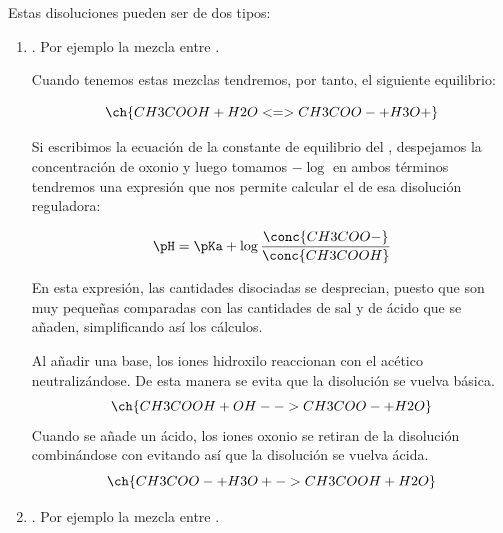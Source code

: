     Estas disoluciones pueden ser de dos tipos:
    \begin{enumerate}[label=\numberballmDarkTeal]
        \item {}.
        Por ejemplo la mezcla entre .

        Cuando tenemos estas mezclas tendremos, por tanto, el siguiente equilibrio:

        \begin{equation*}
            \ch{CH3COOH + H2O <=> CH3COO- + H3O+}
        \end{equation*}

        Si escribimos la ecuación de la constante de equilibrio del , despejamos la concentración de oxonio y luego tomamos \( -\log  \) en ambos términos tendremos una expresión que nos permite calcular el \pH{} de esa disolución reguladora:



        \begin{equation*}
            \pH = \pKa + \log\dfrac{\conc{CH3COO-}}{\conc{CH3COOH}}
        \end{equation*}

        En esta expresión, las cantidades disociadas se desprecian, puesto que son muy pequeñas comparadas con las cantidades de sal y de ácido que se añaden, simplificando así los cálculos.

        Al añadir una base, los iones hidroxilo reaccionan con el acético neutralizándose.
        De esta manera se evita que la disolución se vuelva básica.
        \begin{equation*}
            \ch{CH3COOH + OH- -> CH3COO- + H2O}
        \end{equation*}
        Cuando se añade un ácido, los iones oxonio se retiran de la disolución combinándose con  evitando así que la disolución se vuelva ácida.
        \begin{equation*}
            \ch{CH3COO- + H3O+ -> CH3COOH + H2O}
        \end{equation*}
        \item {}.
        Por ejemplo la mezcla entre .


\end{enumerate}
